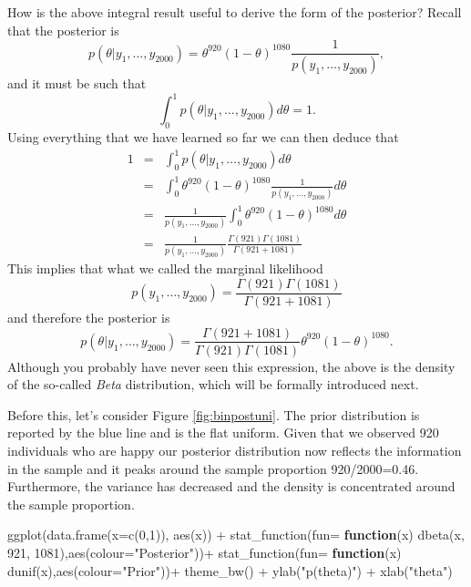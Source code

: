\documentclass[
]{book}
\newenvironment{Shaded}{\begin{snugshade}}{\end{snugshade}}
\newcommand{\AttributeTok}[1]{\textcolor[rgb]{0.77,0.63,0.00}{#1}}
\newcommand{\ControlFlowTok}[1]{\textcolor[rgb]{0.13,0.29,0.53}{\textbf{#1}}}
\newcommand{\DecValTok}[1]{\textcolor[rgb]{0.00,0.00,0.81}{#1}}
\newcommand{\FunctionTok}[1]{\textcolor[rgb]{0.00,0.00,0.00}{#1}}
\newcommand{\NormalTok}[1]{#1}
\newcommand{\SpecialCharTok}[1]{\textcolor[rgb]{0.00,0.00,0.00}{#1}}
\newcommand{\StringTok}[1]{\textcolor[rgb]{0.31,0.60,0.02}{#1}}
\begin{document}
How is the above integral result useful to derive the form of the posterior? Recall that the posterior is
\[
p(\theta|y_1,\dots,y_{2000}) = \theta^{920}(1-\theta)^{1080}\frac{1}{p(y_1,\dots,y_{2000})},
\]
and it must be such that
\[
\int_0^1p(\theta|y_1,\dots,y_{2000})d\theta = 1. 
\]
Using everything that we have learned so far we can then deduce that
\begin{eqnarray*}
1 & = & \int_0^1p(\theta|y_1,\dots,y_{2000})d\theta \\
& = &  \int_0^1 \theta^{920}(1-\theta)^{1080}\frac{1}{p(y_1,\dots,y_{2000})}d\theta\\
& = &\frac{1}{p(y_1,\dots,y_{2000})} \int_0^1 \theta^{920}(1-\theta)^{1080}d\theta\\
&= & \frac{1}{p(y_1,\dots,y_{2000})} \frac{\Gamma(921)\Gamma(1081)}{\Gamma(921 + 1081)}
\end{eqnarray*}
This implies that what we called the marginal likelihood
\[
p(y_1,\dots,y_{2000})=\frac{\Gamma(921)\Gamma(1081)}{\Gamma(921 + 1081)}
\]
and therefore the posterior is
\[
p(\theta|y_1,\dots,y_{2000}) = \frac{\Gamma(921 + 1081)}{\Gamma(921)\Gamma(1081)}\theta^{920}(1-\theta)^{1080}.
\]
Although you probably have never seen this expression, the above is the density of the so-called \emph{Beta} distribution, which will be formally introduced next.

Before this, let's consider Figure \ref{fig:binpostuni}. The prior distribution is reported by the blue line and is the flat uniform. Given that we observed 920 individuals who are happy our posterior distribution now reflects the information in the sample and it peaks around the sample proportion 920/2000=0.46. Furthermore, the variance has decreased and the density is concentrated around the sample proportion.

\begin{Shaded}
\begin{Highlighting}[]
\FunctionTok{ggplot}\NormalTok{(}\FunctionTok{data.frame}\NormalTok{(}\AttributeTok{x=}\FunctionTok{c}\NormalTok{(}\DecValTok{0}\NormalTok{,}\DecValTok{1}\NormalTok{)), }\FunctionTok{aes}\NormalTok{(x)) }\SpecialCharTok{+}
  \FunctionTok{stat\_function}\NormalTok{(}\AttributeTok{fun=} \ControlFlowTok{function}\NormalTok{(x) }\FunctionTok{dbeta}\NormalTok{(x, }\DecValTok{921}\NormalTok{, }\DecValTok{1081}\NormalTok{),}\FunctionTok{aes}\NormalTok{(}\AttributeTok{colour=}\StringTok{"Posterior"}\NormalTok{))}\SpecialCharTok{+}
   \FunctionTok{stat\_function}\NormalTok{(}\AttributeTok{fun=} \ControlFlowTok{function}\NormalTok{(x) }\FunctionTok{dunif}\NormalTok{(x),}\FunctionTok{aes}\NormalTok{(}\AttributeTok{colour=}\StringTok{"Prior"}\NormalTok{))}\SpecialCharTok{+}
  \FunctionTok{theme\_bw}\NormalTok{() }\SpecialCharTok{+} \FunctionTok{ylab}\NormalTok{(}\StringTok{"p(theta)"}\NormalTok{) }\SpecialCharTok{+} \FunctionTok{xlab}\NormalTok{(}\StringTok{"theta"}\NormalTok{)}
\end{Highlighting}
\end{Shaded}
\end{document}
